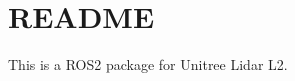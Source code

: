 \chapter{README}
\hypertarget{md_src_2unilidar__sdk2_2unitree__lidar__ros2_2src_2unitree__lidar__ros2_2README}{}\label{md_src_2unilidar__sdk2_2unitree__lidar__ros2_2src_2unitree__lidar__ros2_2README}
This is a ROS2 package for Unitree Lidar L2. 
